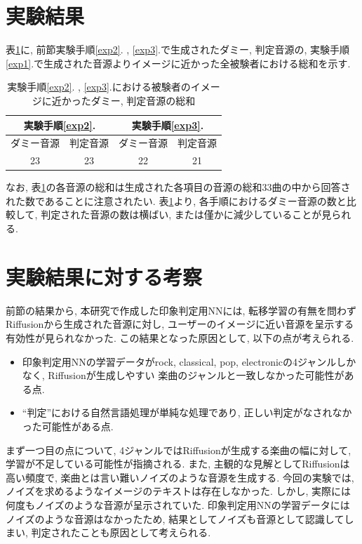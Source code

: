 \documentclass[a4paper,11pt,dvipdfmx]{jreport}
\begin{document}
\section{実験結果}
表\ref{table}に, 前節実験手順\ref{exp2}. , \ref{exp3}.で生成されたダミー, 判定音源の, 実験手順\ref{exp1}.で生成された音源よりイメージに近かった全被験者における総和を示す.

\begin{table}[htb]
  \caption{実験手順\ref{exp2}. , \ref{exp3}.における被験者のイメージに近かったダミー, 判定音源の総和}
    \label{table}
    \vspace{2mm}
    \begin{center}
        \begin{tabular}{|c|c|c|c|}
            \hline
            \multicolumn{2}{|c|}{実験手順\ref{exp2}.}&\multicolumn{2}{|c|}{実験手順\ref{exp3}.}\\
            \hline
            ダミー音源 & 判定音源 & ダミー音源 & 判定音源\\
            \hline
            23 & 23 & 22 & 21\\
            \hline
        \end{tabular}
        \end{center}
\end{table}

なお, 表\ref{table}の各音源の総和は生成された各項目の音源の総和33曲の中から回答された数であることに注意されたい.
表\ref{table}より, 各手順におけるダミー音源の数と比較して, 判定された音源の数は横ばい, または僅かに減少していることが見られる.

\section{実験結果に対する考察}
前節の結果から, 本研究で作成した印象判定用NNには, 転移学習の有無を問わずRiffusionから生成された音源に対し, ユーザーのイメージに近い音源を呈示する有効性が見られなかった.
この結果となった原因として, 以下の点が考えられる.
\begin{itemize}
  \item 印象判定用NNの学習データがrock, classical, pop, 
        electronicの4ジャンルしかなく, Riffusionが生成しやすい
        楽曲のジャンルと一致しなかった可能性がある点.
  \item ``判定''における自然言語処理が単純な処理であり, 正しい判定がなされなかった可能性がある点.
\end{itemize}

まず一つ目の点について, 4ジャンルではRiffusionが生成する楽曲の幅に対して, 学習が不足している可能性が指摘される.
また, 主観的な見解としてRiffusionは高い頻度で, 楽曲とは言い難いノイズのような音源を生成する. 
今回の実験では, ノイズを求めるようなイメージのテキストは存在しなかった.
しかし, 実際には何度もノイズのような音源が呈示されていた.
印象判定用NNの学習データにはノイズのような音源はなかったため, 結果としてノイズも音源として認識してしまい, 判定されたことも原因として考えられる.
\end{document}
